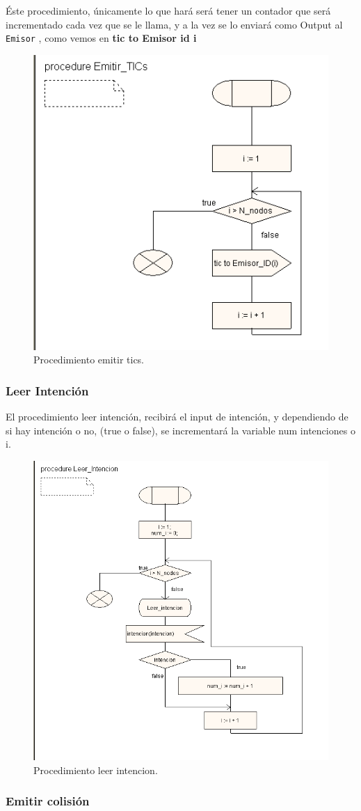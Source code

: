 \documentclass{article}
\begin{document}
Éste procedimiento, únicamente lo que hará será tener un contador que será  incrementado cada vez que se le llama, y a la vez se lo enviará como Output al \verb|Emisor| , como vemos en \textbf{tic to Emisor id i}

\begin{figure}[hbt]
    \centering
    \includegraphics[width=0.3\linewidth]{src/proc emitir tics.png}
    \caption{\label{fig:emitirtics} Procedimiento emitir tics.}
\end{figure}

\subsubsection{Leer Intención}

El procedimiento leer intención, recibirá el input de intención, y dependiendo de si hay intención o no, (true o false), se incrementará la variable num intenciones o i.

\quad

\begin{figure}[h]
    \centering
    \includegraphics[width=0.6\linewidth]{src/leer intencion.png}
    \caption{\label{fig:leerintencion} Procedimiento leer intencion.}
\end{figure}

\subsubsection{Emitir colisión}
\end{document}
